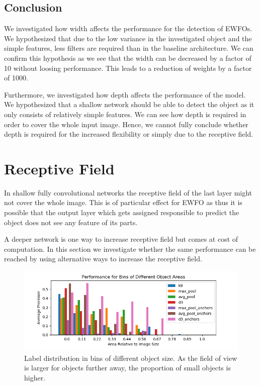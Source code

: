 	\subsection{Conclusion}
	
	We investigated how width affects the performance for the detection of \acp{EWFO}. We hypothesized that due to the low variance in the investigated object and the simple features, less filters are required than in the baseline architecture. We can confirm this hypothesis as we see that the width can be decreased by a factor of 10 without loosing performance. This leads to a reduction of weights by a factor of 1000. 
	
	Furthermore, we investigated how depth affects the performance of the model. We hypothesized that a shallow network should be able to detect the object as it only consists of relatively simple features. We can see how depth is required in order to cover the whole input image. Hence, we cannot fully conclude whether depth is required for the increased flexibility or simply due to the receptive field. 
	
	\section{Receptive Field}
	
	In shallow fully convolutional networks the receptive field of the last layer might not cover the whole image. This is of particular effect for \ac{EWFO} as thus it is possible that the output layer which gets assigned responsible to predict the object does not see any feature of its parts.
	
	A deeper network is one way to increase receptive field but comes at cost of computation. In this section we investigate whether the same performance can be reached by using alternative ways to increase the receptive field.
	
	\begin{figure}[hbtp]
		\centering
		\includegraphics[width=\textwidth]{fig/rf_ap_size}
		\caption{Label distribution in bins of different object size. As the field of view is larger for objects further away, the proportion of small objects is higher.}
		\label{fig:size_bins}
	\end{figure}
	
